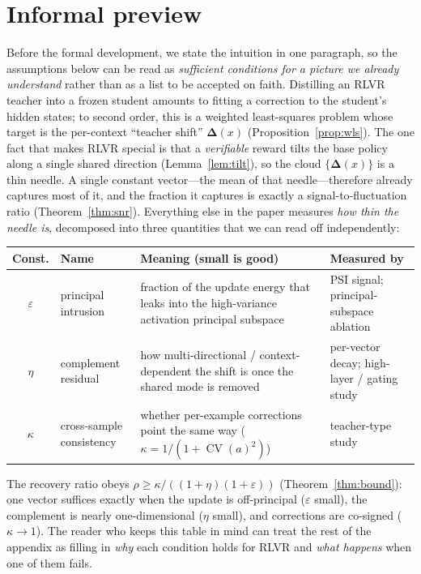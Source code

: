 \documentclass[11pt]{article}
\DeclareMathOperator{\CV}{CV}
\newcommand{\bDelta}{\bm{\Delta}}
\begin{document}
\section*{Informal preview}
Before the formal development, we state the intuition in one paragraph, so the assumptions below
can be read as \emph{sufficient conditions for a picture we already understand} rather than as a
list to be accepted on faith. Distilling an RLVR teacher into a frozen student amounts to fitting a
correction to the student's hidden states; to second order, this is a weighted least-squares problem
whose target is the per-context ``teacher shift'' $\bDelta(x)$ (Proposition~\ref{prop:wls}). The one
fact that makes RLVR special is that a \emph{verifiable} reward tilts the base policy along a single
shared direction (Lemma~\ref{lem:tilt}), so the cloud $\{\bDelta(x)\}$ is a thin needle. A single
constant vector---the mean of that needle---therefore already captures most of it, and the fraction
it captures is exactly a signal-to-fluctuation ratio (Theorem~\ref{thm:snr}). Everything else in the
paper measures \emph{how thin the needle is}, decomposed into three quantities that we can read off
independently:
\begin{table}[h]
\centering\small
\renewcommand{\arraystretch}{1.3}
\begin{tabularx}{\textwidth}{@{}clXl@{}}
\toprule
\textbf{Const.} & \textbf{Name} & \textbf{Meaning (small is good)} & \textbf{Measured by} \\
\midrule
$\varepsilon$ & principal intrusion & fraction of the update energy that leaks into the
high-variance activation principal subspace & PSI signal; principal-subspace ablation \\
$\eta$ & complement residual & how multi-directional / context-dependent the shift is once the shared
mode is removed & per-vector decay; high-layer / gating study \\
$\kappa$ & cross-sample consistency & whether per-example corrections point the same way
($\kappa=1/(1+\CV(a)^2)$) & teacher-type study \\
\bottomrule
\end{tabularx}
\end{table}

\noindent
The recovery ratio obeys $\rho\ge\kappa/((1+\eta)(1+\varepsilon))$ (Theorem~\ref{thm:bound}): one
vector suffices exactly when the update is off-principal ($\varepsilon$ small), the complement is
nearly one-dimensional ($\eta$ small), and corrections are co-signed ($\kappa\to1$). The reader who
keeps this table in mind can treat the rest of the appendix as filling in \emph{why} each condition
holds for RLVR and \emph{what happens} when one of them fails.
\end{document}
